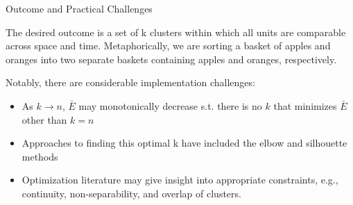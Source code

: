 \begin{frame}{Outcome and Practical Challenges}

The desired outcome is a set of k clusters within which all units are comparable across space and time. Metaphorically, we are sorting a basket of apples and oranges into two separate baskets containing apples and oranges, respectively. 

Notably, there are considerable implementation challenges:\\
\begin{itemize}
    \item As $k \rightarrow n$, $\bar{E}$ may monotonically decrease s.t. there is no $k$ that minimizes $\bar{E}$ other than $k=n$
    \vspace{-7pt}
    \item Approaches to finding this optimal k have included the elbow and silhouette methods
    \vspace{-7pt}
    \item Optimization literature may give insight into appropriate constraints, e.g., continuity, non-separability, and overlap of clusters. 
\end{itemize}
\end{frame}
